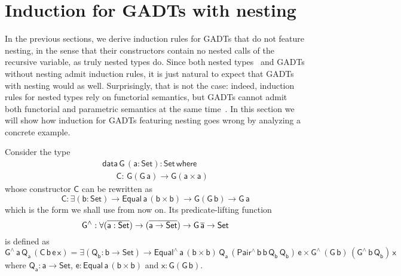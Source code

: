 \documentclass[acmsmall,screen,review,anonymous]{acmart}
\theoremstyle{definition}
\begin{document}
\section{Induction for GADTs with nesting}\label{sec:GADT-nested}

In the previous sections,
we derive induction rules for GADTs that do not feature nesting,
in the sense that their constructors contain no nested calls of the recursive variable,
as truly nested types do.
Since both nested types~\cite{jp20}
and GADTs without nesting admit induction rules,
it is just natural to expect that GADTs with nesting would as well.
Surprisingly, that is not the case:
indeed, induction rules for nested types rely on functorial semantics,
but GADTs cannot admit both functorial and parametric semantics at the same time~\cite{HaskellPaper}.
In this section we will show how induction for GADTs featuring nesting goes wrong
by analyzing a concrete example.

Consider the type
\begin{equation}
\begin{array}{l}
\mathsf{data\, G\,(a : Set) : Set\,where}\\
\mathsf{\;\;\;\;\;\;C :\, G(G\,a) \to G(a \times a)}
\end{array}
\end{equation}
whose constructor $\mathsf{C}$ can be rewritten as
\[
\mathsf{C : \exists (b : Set) \to Equal\,a\,(b \times b) \to G(G\,b) \to G\,a}
\]
which is the form we shall use from now on.
Its predicate-lifting function
\[
\mathsf{G^{\wedge} : \forall (\overline{a : Set}) \to (\overline{a \to Set}) \to G\,\overline{a} \to Set}
\]
is defined as
\[
\mathsf{G^{\wedge}\,a\,Q_a\,(C\,b\,e\,x)
= \exists (Q_b : b \to Set)
\to Equal^{\wedge}\,a\,(b \times b)\,Q_a\,(Pair^{\wedge}\,b\,b\,Q_b\,Q_b)\,e
\times G^{\wedge}\,(G\,b)\,(G^{\wedge}\,b\,Q_b)\,x}
\]
where $\mathsf{Q_a : a \to Set}$, $\mathsf{e : Equal\,a\,(b \times b)}$ and $\mathsf{x : G(G\,b)}$.
\end{document}
